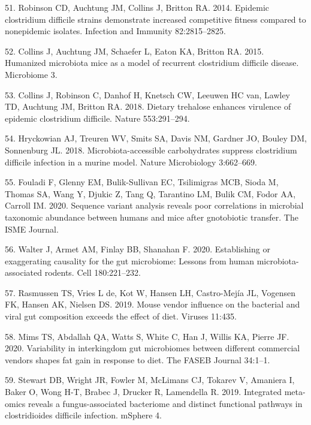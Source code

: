 \documentclass[11pt,]{article}
\begin{document}
\hypertarget{ref-Robinson2014}{}
51. Robinson CD, Auchtung JM, Collins J, Britton RA. 2014. Epidemic
clostridium difficile strains demonstrate increased competitive fitness
compared to nonepidemic isolates. Infection and Immunity 82:2815--2825.

\hypertarget{ref-Collins2015}{}
52. Collins J, Auchtung JM, Schaefer L, Eaton KA, Britton RA. 2015.
Humanized microbiota mice as a model of recurrent clostridium difficile
disease. Microbiome 3.

\hypertarget{ref-Collins2018}{}
53. Collins J, Robinson C, Danhof H, Knetsch CW, Leeuwen HC van, Lawley
TD, Auchtung JM, Britton RA. 2018. Dietary trehalose enhances virulence
of epidemic clostridium difficile. Nature 553:291--294.

\hypertarget{ref-Hryckowian2018}{}
54. Hryckowian AJ, Treuren WV, Smits SA, Davis NM, Gardner JO, Bouley
DM, Sonnenburg JL. 2018. Microbiota-accessible carbohydrates suppress
clostridium difficile infection in a murine model. Nature Microbiology
3:662--669.

\hypertarget{ref-Fouladi2020}{}
55. Fouladi F, Glenny EM, Bulik-Sullivan EC, Tsilimigras MCB, Sioda M,
Thomas SA, Wang Y, Djukic Z, Tang Q, Tarantino LM, Bulik CM, Fodor AA,
Carroll IM. 2020. Sequence variant analysis reveals poor correlations in
microbial taxonomic abundance between humans and mice after gnotobiotic
transfer. The ISME Journal.

\hypertarget{ref-Walter2020}{}
56. Walter J, Armet AM, Finlay BB, Shanahan F. 2020. Establishing or
exaggerating causality for the gut microbiome: Lessons from human
microbiota-associated rodents. Cell 180:221--232.

\hypertarget{ref-Rasmussen2019}{}
57. Rasmussen TS, Vries L de, Kot W, Hansen LH, Castro-Mejía JL,
Vogensen FK, Hansen AK, Nielsen DS. 2019. Mouse vendor influence on the
bacterial and viral gut composition exceeds the effect of diet. Viruses
11:435.

\hypertarget{ref-Mims2020}{}
58. Mims TS, Abdallah QA, Watts S, White C, Han J, Willis KA, Pierre JF.
2020. Variability in interkingdom gut microbiomes between different
commercial vendors shapes fat gain in response to diet. The FASEB
Journal 34:1--1.

\hypertarget{ref-Stewart2019}{}
59. Stewart DB, Wright JR, Fowler M, McLimans CJ, Tokarev V, Amaniera I,
Baker O, Wong H-T, Brabec J, Drucker R, Lamendella R. 2019. Integrated
meta-omics reveals a fungus-associated bacteriome and distinct
functional pathways in clostridioides difficile infection. mSphere 4.
\end{document}
